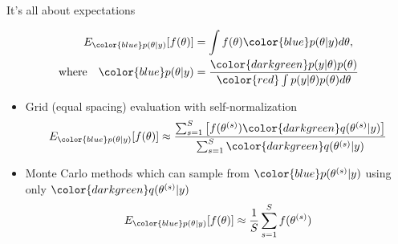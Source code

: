 \documentclass[finnish,english,t]{beamer}
\begin{document}
\begin{frame}{It's all about expectations}

  \vspace{-1.5\baselineskip}
   \begin{align*}
     E_{\color{blue} p(\theta|y)}[f(\theta)] & = \int f(\theta) {\color{blue} p(\theta|y)} d\theta,\\
     \text{where} \quad
     {\color{blue} p(\theta|y)} & = \frac{\color{darkgreen}p(y|\theta)p(\theta)}{\color{red} \int p(y|\theta)p(\theta) d\theta}
   \end{align*}

 \begin{itemize}
   \vspace{-0.5\baselineskip}
    \item<4-> Grid (equal spacing) evaluation with self-normalization
      \begin{align*}
        E_{\color{blue} p(\theta|y)}[f(\theta)] \approx
        \frac{\sum_{s=1}^S \left[f(\theta^{(s)}){\color{darkgreen}q(\theta^{(s)}|y)}\right]}{\sum_{s=1}^S{\color{darkgreen}q(\theta^{(s)}|y)}}
      \end{align*}
    \item<5-> Monte Carlo methods which can sample from
      ${\color{blue}p(\theta^{(s)}|y)}$ using only
      ${\color{darkgreen}q(\theta^{(s)}|y)}$
         \vspace{-0.5\baselineskip}
      \begin{align*}
        E_{\color{blue} p(\theta|y)}[f(\theta)] \approx \frac{1}{S} \sum_{s=1}^S f(\theta^{(s)})
      \end{align*}
    \end{itemize}
   
\end{frame}
\end{document}
